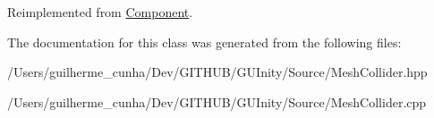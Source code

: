 Reimplemented from \hyperlink{class_component_a72d67b02e6733c1a6fb73cbaaf8ebff4}{Component}.



The documentation for this class was generated from the following files\+:\begin{DoxyCompactItemize}
\item 
/\+Users/guilherme\+\_\+cunha/\+Dev/\+G\+I\+T\+H\+U\+B/\+G\+U\+Inity/\+Source/Mesh\+Collider.\+hpp\item 
/\+Users/guilherme\+\_\+cunha/\+Dev/\+G\+I\+T\+H\+U\+B/\+G\+U\+Inity/\+Source/Mesh\+Collider.\+cpp\end{DoxyCompactItemize}
